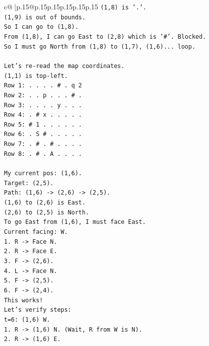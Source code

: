 \documentclass{article}
\begin{document}
{\begin{supertabular}{c@{$\;$}|p{.15\linewidth}@{}p{.15\linewidth}p{.15\linewidth}p{.15\linewidth}p{.15\linewidth}p{.15\linewidth}}
{{{\texttt{(1,8) is '.'.} \\
\texttt{(1,9) is out of bounds.} \\
\texttt{So I can go to (1,8).} \\
\texttt{From (1,8), I can go East to (2,8) which is '\#'. Blocked.} \\
\texttt{So I must go North from (1,8) to (1,7), (1,6)... loop.} \\
\\ 
\texttt{Let's re{-}read the map coordinates.} \\
\texttt{(1,1) is top{-}left.} \\
\texttt{Row 1: . . . . \# . q 2} \\
\texttt{Row 2: . . p . . . \# .} \\
\texttt{Row 3: . . . . y . . .} \\
\texttt{Row 4: . \# x . . . . .} \\
\texttt{Row 5: \# 1 . . . . . .} \\
\texttt{Row 6: . S \# . . . . .} \\
\texttt{Row 7: . \# . \# . . . .} \\
\texttt{Row 8: . \# . A . . . .} \\
\\ 
\texttt{My current pos: (1,6).} \\
\texttt{Target: (2,5).} \\
\texttt{Path: (1,6) {-}> (2,6) {-}> (2,5).} \\
\texttt{(1,6) to (2,6) is East.} \\
\texttt{(2,6) to (2,5) is North.} \\
\texttt{To go East from (1,6), I must face East.} \\
\texttt{Current facing: W.} \\
\texttt{1. R {-}> Face N.} \\
\texttt{2. R {-}> Face E.} \\
\texttt{3. F {-}> (2,6).} \\
\texttt{4. L {-}> Face N.} \\
\texttt{5. F {-}> (2,5).} \\
\texttt{6. F {-}> (2,4).} \\
\texttt{This works!} \\
\texttt{Let's verify steps:} \\
\texttt{t=6: (1,6) W.} \\
\texttt{1. R {-}> (1,6) N. (Wait, R from W is N).} \\
\texttt{2. R {-}> (1,6) E.} \\
}}}
\end{supertabular}}
\end{document}
